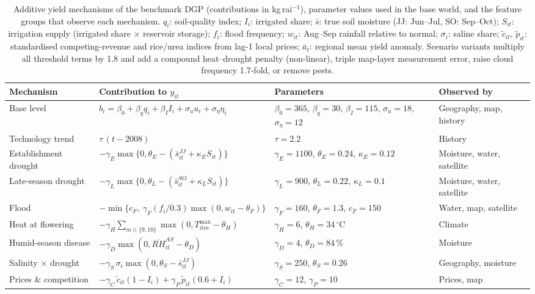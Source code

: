 \begin{table}[t]\centering\scriptsize
\caption{Additive yield mechanisms of the benchmark DGP (contributions in kg\,rai$^{-1}$), parameter values used in the base world, and the feature groups that observe each mechanism. $q_i$: soil-quality index; $I_i$: irrigated share; $\bar s$: true soil moisture (JJ: Jun--Jul, SO: Sep--Oct); $S_{it}$: irrigation supply (irrigated share $\times$ reservoir storage); $f_i$: flood frequency; $w_{it}$: Aug--Sep rainfall relative to normal; $\sigma_i$: saline share; $\tilde c_{it}$, $\tilde p_{it}$: standardised competing-revenue and rice/urea indices from lag-1 local prices; $\bar a_t$: regional mean yield anomaly. Scenario variants multiply all threshold terms by 1.8 and add a compound heat--drought penalty (non-linear), triple map-layer measurement error, raise cloud frequency 1.7-fold, or remove pests.}\label{tab:dgp}
\begin{tabularx}{\textwidth}{@{}p{2.3cm}Xp{3.9cm}p{2.3cm}@{}}
\toprule
Mechanism & Contribution to $y_{it}$ & Parameters & Observed by \\
\midrule
Base level & $b_i=\beta_0+\beta_q q_i+\beta_I I_i+\sigma_u u_i+\sigma_\eta\eta_i$ & $\beta_0=365$, $\beta_q=30$, $\beta_I=115$, $\sigma_u=18$, $\sigma_\eta=12$ & Geography, map, history \\
Technology trend & $\tau\,(t-2008)$ & $\tau=2.2$ & History \\
Establishment drought & $-\gamma_E\max\{0,\theta_E-(\bar s^{JJ}_{it}+\kappa_E S_{it})\}$ & $\gamma_E=1100$, $\theta_E=0.24$, $\kappa_E=0.12$ & Moisture, water, satellite \\
Late-season drought & $-\gamma_L\max\{0,\theta_L-(\bar s^{SO}_{it}+\kappa_L S_{it})\}$ & $\gamma_L=900$, $\theta_L=0.22$, $\kappa_L=0.1$ & Moisture, water, satellite \\
Flood & $-\min\{c_F,\ \gamma_F (f_i/0.3)\max(0,w_{it}-\theta_F)\}$ & $\gamma_F=160$, $\theta_F=1.3$, $c_F=150$ & Water, map, satellite \\
Heat at flowering & $-\gamma_H\sum_{m\in\{9,10\}}\max(0,T^{\max}_{itm}-\theta_H)$ & $\gamma_H=6$, $\theta_H=34$\,$^\circ$C & Climate \\
Humid-season disease & $-\gamma_D\max(0,\overline{RH}^{AS}_{it}-\theta_D)$ & $\gamma_D=4$, $\theta_D=84$\,\% & Moisture \\
Salinity $\times$ drought & $-\gamma_S\,\sigma_i\max(0,\theta_S-\bar s^{JJ}_{it})$ & $\gamma_S=250$, $\theta_S=0.26$ & Geography, moisture \\
Prices \& competition & $-\gamma_C\,\tilde c_{it}(1-I_i)+\gamma_P\,\tilde p_{it}(0.6+I_i)$ & $\gamma_C=12$, $\gamma_P=10$ & Prices, map \\

\end{tabularx}
\end{table}
